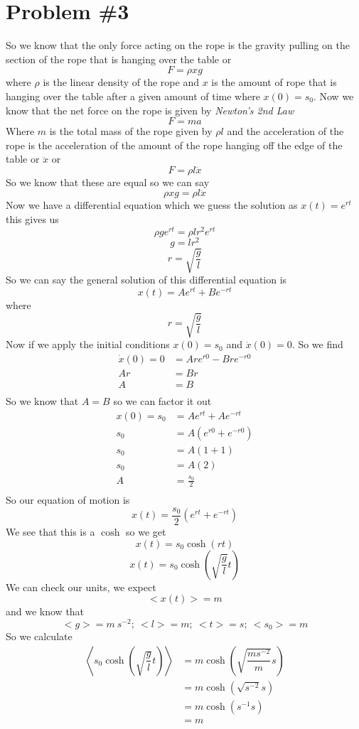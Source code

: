 \documentclass[11pt]{article}
\numberwithin{equation}{section}
\begin{document}
\section{Problem \#3}
So we know that the only force acting on the rope is the gravity pulling on the section of the rope that is hanging over the table or
$$F = \rho x g$$
where $\rho$ is the linear density of the rope and $x$ is the amount of rope that is hanging over the table after a given amount of time where $x(0) = s_0$. Now we know that the net force on the rope is given by \emph{Newton's 2nd Law}
$$F=ma$$
Where $m$ is the total mass of the rope given by $\rho l$ and the acceleration of the rope is the acceleration of the amount of the rope hanging off the edge of the table or $\ddot{x}$ or 
$$F=\rho l \ddot{x}$$ 
So we know that these are equal so we can say
$$\rho x g =\rho l \ddot{x}$$ 
Now we have a differential equation which we guess the solution as $x(t) = e^{rt}$ this gives us
$$\rho g e^{rt} =\rho l r^2e^{rt}$$ 
$$g = l r^2$$ 
$$r = \sqrt{\frac{g}{l}}$$ 
So we can say the general solution of this differential equation is
$$x(t) = Ae^{rt} + Be^{-rt}$$
where 
$$r = \sqrt{\frac{g}{l}}$$ 
Now if we apply the initial conditions $x(0)=s_0$ and $\dot{x}(0) = 0$. So we find 
\begin{align*}
\dot{x}(0) = 0 &= A r e^{r0} - B r e^{-r0}\\
 A r  &= B r\\
 A &= B \\
\end{align*}
So we know that $A=B$ so we can factor it out
\begin{align*}
x(0) =s_0 &= Ae^{rt} + Ae^{-rt}\\
s_0 &= A(e^{r0} + e^{-r0})\\
s_0 &= A(1 + 1)\\
s_0 &= A(2)\\
A &= \frac{s_0}{2}\\
\end{align*}
So our equation of motion is
$$x(t) = \frac{s_0}{2}(e^{rt}+e^{-rt})$$
We see that this is a $\cosh$ so we get
$$x(t) = s_0\cosh(rt)$$
$$x(t) = s_0\cosh\left(\sqrt{\dfrac{g}{l}}t\right)$$
We can check our units, we expect $$<x(t)> = m$$
and we know that
$$<g> = m\ s^{-2};\ <l> = m;\ <t> = s;\ <s_0> = m$$
So we calculate 
\begin{align*}
\left<s_0\cosh\left(\sqrt{\dfrac{g}{l}}t\right)\right> &= m\cosh\left(\sqrt{\dfrac{m s^{-2}}{m}}s\right)\\
&= m\cosh\left(\sqrt{{s^{-2}}}s\right)\\
&= m\cosh\left(s^{-1}s\right)\\
&= m\\
\end{align*}
\end{document}
